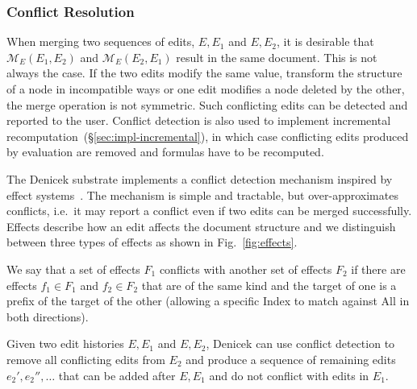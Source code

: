 \documentclass[sigconf]{acmart}
\newcommand{\diff}[1]{{#1}}
\newcommand{\note}[1]{}
\newcommand{\ident}[1]{{\sffamily #1}}
\begin{document}

\subsubsection*{Conflict Resolution}
When merging two sequences of edits, $E, E_1$ and $E, E_2$, it is desirable that
$\mathcal{M}_E(E_1, E_2)$ and $\mathcal{M}_E(E_2, E_1)$ result in the same document.
This is not always the case. If the two edits modify the same value, transform the structure of a node
in incompatible ways or one edit modifies a node deleted by the other, the merge operation
is not symmetric. Such conflicting edits can be detected and reported to the user.
\diff{Conflict detection is also used to implement incremental recomputation~(\S\ref{sec:impl-incremental}),
in which case conflicting edits produced by evaluation are removed and formulas have to be
recomputed.}\note{Clarify conflicting edits are only removed in incremental evaluation}

%

The Denicek substrate implements a conflict detection mechanism inspired by effect
systems~\cite{lucassen-1988-effects}. The mechanism is simple and tractable, but over-approximates
conflicts, i.e.~it may report a conflict even if two edits can be merged successfully.
Effects describe how an edit affects the document structure
and we distinguish between three types of effects as shown in Fig.~\ref{fig:effects}.

We say that a set of effects $F_1$ conflicts with another set of effects $F_2$ if there
are effects $f_1\in F_1$ and $f_2\in F_2$ that are of the same kind and the target
of one is a prefix of the target of the other (allowing a specific \ident{Index} to
match against \ident{All} in both directions).

Given two edit histories $E, E_1$ and $E, E_2$, Denicek can use conflict detection to remove
all conflicting edits from $E_2$ and produce a sequence of remaining edits $e_2', e_2'', \ldots$
that can be added after $E, E_1$ and do not conflict with edits in $E_1$.
\end{document}
